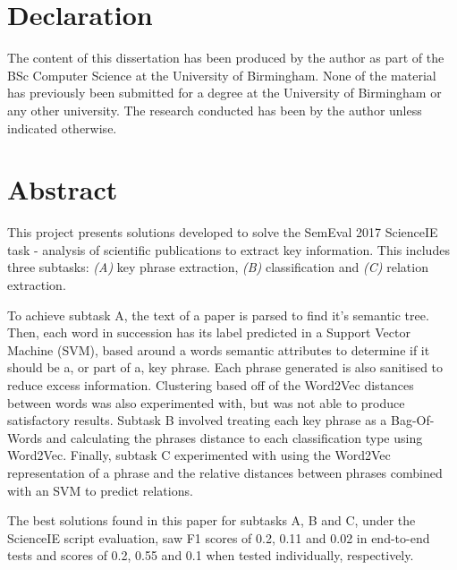 \documentclass[a4paper]{report}
\begin{document}

\section*{Declaration}
The content of this dissertation has been produced by the author as part of the BSc Computer Science at the University of Birmingham. None of the material has previously been submitted for a degree at the University of Birmingham or any other university. The research conducted has been by the author unless indicated otherwise.

\pagebreak

\section*{Abstract}
This project presents solutions developed to solve the SemEval 2017 ScienceIE task - analysis of scientific publications to extract key information. This includes three subtasks: \textit{(A)} key phrase extraction, \textit{(B)} classification and \textit{(C)} relation extraction.

To achieve subtask A, the text of a paper is parsed to find it's semantic tree. Then, each word in succession has its label predicted in a Support Vector Machine (SVM), based around a words semantic attributes to determine if it should be a, or part of a, key phrase. Each phrase generated is also sanitised to reduce excess information. Clustering based off of the Word2Vec distances between words was also experimented with, but was not able to produce satisfactory results. Subtask B involved treating each key phrase as a Bag-Of-Words and calculating the phrases distance to each classification type using Word2Vec. Finally, subtask C experimented with using the Word2Vec representation of a phrase and the relative distances between phrases combined with an SVM to predict relations.

The best solutions found in this paper for subtasks A, B and C, under the ScienceIE script evaluation, saw F1 scores of 0.2, 0.11 and 0.02 in end-to-end tests and scores of 0.2, 0.55 and 0.1 when tested individually, respectively. 
\end{document}
